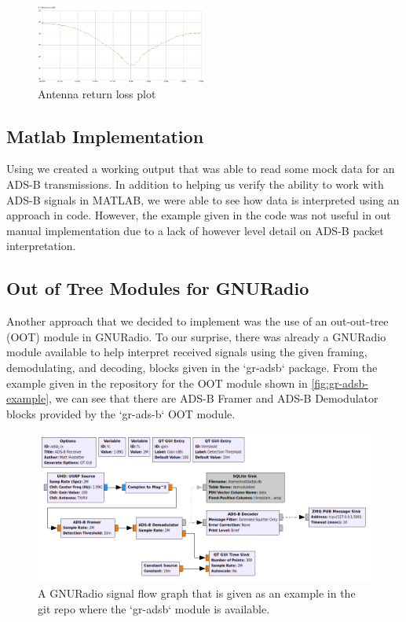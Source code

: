 \documentclass[conference, onecolumn]{IEEEtran}
\begin{document}
\begin{figure}
  \begin{center}
    \includegraphics[width=0.5\textwidth]{./figures/fig_antenna_plot.png}
  \end{center}
  \caption{Antenna return loss plot}\label{fig:ant_plot}
\end{figure}

\subsection{Matlab Implementation}
 Using \cite{matlabAir} we created a working output that was able to read some mock data for an ADS-B transmissions. In addition to helping us verify the ability to work with ADS-B signals in MATLAB, we were able to see how data is interpreted using an approach in code. However, the example given in the code was not useful in out manual implementation due to a lack of however level detail on ADS-B packet interpretation.

\subsection{Out of Tree Modules for GNURadio}
Another approach that we decided to implement was the use of an out-out-tree (OOT) module \cite{oot-adsb} in GNURadio. To our surprise, there was already a GNURadio module available to help interpret received signals using the given framing, demodulating, and decoding, blocks given in the `gr-adsb` package. From the example given in the repository for the OOT module shown in \autoref{fig:gr-adsb-example}, we can see that there are ADS-B Framer and ADS-B Demodulator blocks provided by the `gr-ads-b` OOT module. 

\begin{figure}
  \begin{center}
    \includegraphics[width=\textwidth]{./figures/adsb_rx.png}
  \end{center}
  \caption{A GNURadio signal flow graph that is given as an example in the git repo where the `gr-adsb` module is available.}\label{fig:gr-adsb-example}
\end{figure}
\end{document}
